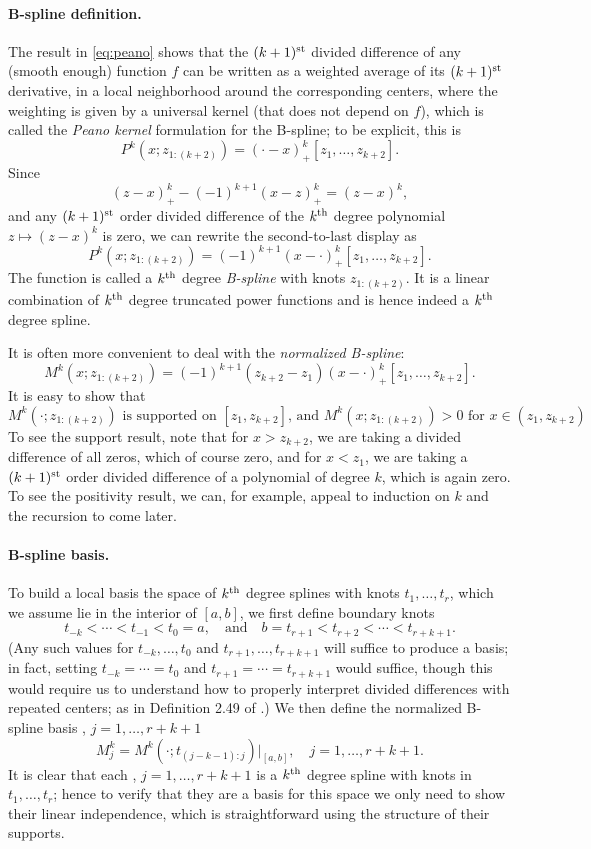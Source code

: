 \documentclass{article}
\begin{document}
\paragraph{B-spline definition.}  

The result in \eqref{eq:peano} shows that the $(k+1)^{\text{st}}$ divided difference 
of any (smooth enough) function $f$ can be written as a weighted average of 
its $(k+1)^{\text{st}}$ derivative, in a local neighborhood around the corresponding
centers, where the weighting is given by a universal kernel  (that does not depend on $f$), which is called the \emph{Peano 
  kernel} formulation for the B-spline; to be explicit, this is
\[
P^k(x; z_{1:(k+2)}) = (\cdot - x)^k_+[z_1,\dots,z_{k+2}].
\]
Since 
\[
(z-x)^k_+ - (-1)^{k+1} (x-z)^k_+ =  (z-x)^k,
\]
and any $(k+1)^{\text{st}}$ order divided difference of the $k^{\text{th}}$ degree polynomial $z
\mapsto (z-x)^k$ is zero, we can rewrite the second-to-last display as
\[
P^k(x; z_{1:(k+2)}) = (-1)^{k+1} (x - \cdot)^k_+[z_1,\dots,z_{k+2}].
\]
The function  is called a $k^{\text{th}}$ degree
\emph{B-spline} with knots $z_{1:(k+2)}$. It is a linear combination of $k^{\text{th}}$ 
degree truncated power functions and is hence indeed a $k^{\text{th}}$ degree spline.  

It is often more convenient to deal with the \emph{normalized B-spline}:
\[
M^k(x; z_{1:(k+2)}) = (-1)^{k+1} (z_{k+2}-z_1) 
(x - \cdot)^k_+[z_1,\dots,z_{k+2}]. 
\]
It is easy to show that 
\[
\text{$M^k(\cdot; z_{1:(k+2)})$ is supported on $[z_1,z_{k+2}]$, and  
$M^k(x; z_{1:(k+2)})>0$ for $x \in (z_1,z_{k+2})$}.  
\]
To see the support result, note that for $x > z_{k+2}$, we are taking a divided
difference of all zeros, which of course zero, and for $x < z_1$, we are taking 
a $(k+1)^{\text{st}}$ order divided difference of a polynomial of degree $k$, which is
again zero. To see the positivity result, we can, for example, appeal to 
induction on $k$ and the recursion to come later.

\paragraph{B-spline basis.}  

To build a local basis the space of $k^{\text{th}}$ degree splines with knots
$t_1,\dots,t_r$, which we assume lie in the interior of $[a,b]$, we first define
boundary knots   
\[
t_{-k} < \cdots < t_{-1} < t_0 = a, \quad \text{and} \quad 
b = t_{r+1} < t_{r+2} < \cdots < t_{r+k+1}. 
\]
(Any such values for $t_{-k},\dots,t_0$ and $t_{r+1},\dots,t_{r+k+1}$ will
suffice to produce a basis; in fact, setting $t_{-k}=\cdots=t_0$ and
$t_{r+1}=\cdots=t_{r+k+1}$ would suffice, though this would require us to 
understand how to properly interpret divided differences with repeated centers;
as in Definition 2.49 of \citet{schumaker2007spline}.)  We then define the
normalized B-spline basis , $j=1,\dots,r+k+1$ 
\[
M^k_j = M^k(\cdot ; t_{(j-k-1):j}) \Big|_{[a,b]}, 
\quad j=1,\dots,r+k+1. 
\]
It is clear that each , $j=1,\dots,r+k+1$ is a $k^{\text{th}}$ degree    
spline with knots in $t_1,\dots,t_r$; hence to verify that they are a basis for
this space we only need to show their linear independence, which is
straightforward using the structure of their supports. 
\end{document}
